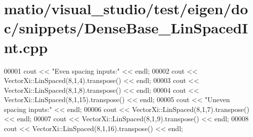 \hypertarget{matio_2visual__studio_2test_2eigen_2doc_2snippets_2_dense_base___lin_spaced_int_8cpp_source}{}\section{matio/visual\+\_\+studio/test/eigen/doc/snippets/\+Dense\+Base\+\_\+\+Lin\+Spaced\+Int.cpp}
\label{matio_2visual__studio_2test_2eigen_2doc_2snippets_2_dense_base___lin_spaced_int_8cpp_source}

\begin{DoxyCode}
00001 cout << \textcolor{stringliteral}{"Even spacing inputs:"} << endl;
00002 cout << VectorXi::LinSpaced(8,1,4).transpose() << endl;
00003 cout << VectorXi::LinSpaced(8,1,8).transpose() << endl;
00004 cout << VectorXi::LinSpaced(8,1,15).transpose() << endl;
00005 cout << \textcolor{stringliteral}{"Uneven spacing inputs:"} << endl;
00006 cout << VectorXi::LinSpaced(8,1,7).transpose() << endl;
00007 cout << VectorXi::LinSpaced(8,1,9).transpose() << endl;
00008 cout << VectorXi::LinSpaced(8,1,16).transpose() << endl;
\end{DoxyCode}
